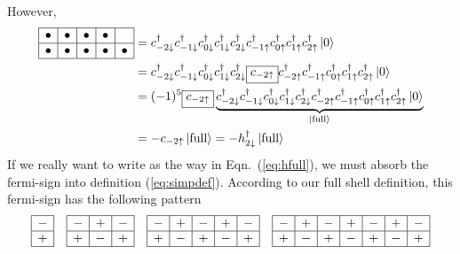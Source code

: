 \vspace{-1em}
However,
\begin{align}
\begin{array}{|c|c|c|c|c|}
\hline
\bullet & \bullet & \bullet & \bullet &  \\ \hline
\bullet & \bullet & \bullet & \bullet & \bullet \\
\hline
\end{array}
& = c_{-2\downarrow}^\dagger c_{-1\downarrow}^\dagger c_{0\downarrow}^\dagger c_{1\downarrow}^\dagger c_{2\downarrow}^\dagger
c_{-1\uparrow}^\dagger c_{0\uparrow}^\dagger c_{1\uparrow}^\dagger c_{2\uparrow}^\dagger
\Ket{0} \nonumber \\
& = c_{-2\downarrow}^\dagger c_{-1\downarrow}^\dagger c_{0\downarrow}^\dagger c_{1\downarrow}^\dagger c_{2\downarrow}^\dagger
\boxed{c_{-2\uparrow}} c_{-2\uparrow}^\dagger c_{-1\uparrow}^\dagger c_{0\uparrow}^\dagger c_{1\uparrow}^\dagger c_{2\uparrow}^\dagger
\Ket{0} \nonumber \\
& = (-1)^{5} \boxed{c_{-2\uparrow}}
\underbrace{c_{-2\downarrow}^\dagger c_{-1\downarrow}^\dagger c_{0\downarrow}^\dagger c_{1\downarrow}^\dagger c_{2\downarrow}^\dagger
c_{-2\uparrow}^\dagger c_{-1\uparrow}^\dagger c_{0\uparrow}^\dagger c_{1\uparrow}^\dagger c_{2\uparrow}^\dagger
\Ket{0}}_{\Ket{\text{full}}} \nonumber \\
& = - c_{-2\uparrow} \Ket{\text{full}} = - h_{2\downarrow}^\dagger \Ket{\text{full}}
\end{align}
%
If we really want to write as the way in Eqn.~(\ref{eq:hfull}),
we must absorb the fermi-sign into definition (\ref{eq:simpdef}).
According to our full shell definition, this fermi-sign has the following pattern
\begin{equation*}
\begin{array}{|c|}
\hline
- \\ \hline
+ \\
\hline
\end{array}
\quad
\begin{array}{|c|c|c|}
\hline
- & + & - \\ \hline
+ & - & + \\
\hline
\end{array}
\quad
\begin{array}{|c|c|c|c|c|}
\hline
- & + & - & + & - \\ \hline
+ & - & + & - & + \\
\hline
\end{array}
\quad
\begin{array}{|c|c|c|c|c|c|c|}
\hline
- & + & - & + & - & + & - \\ \hline
+ & - & + & - & + & - & + \\
\hline
\end{array}
\end{equation*}
